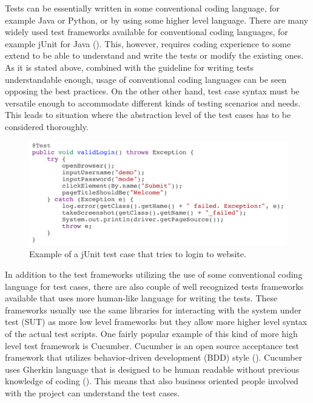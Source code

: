 Tests can be essentially written in some conventional coding language, for example Java or Python, or by using some higher level language. There are many widely used test frameworks available for conventional coding languages, for example jUnit for Java (\emph{\cite{junit}}). This, however, requires coding experience to some extend to be able to understand and write the tests or modify the existing ones. As it is stated above, combined with the guideline for writing tests understandable enough, usage of conventional coding languages can be seen opposing the best practices. On the other other hand, test case syntax must be versatile enough to accommodate different kinds of testing scenarios and needs. This leads to situation where the abstraction level of the test cases has to be considered thoroughly.

\begin{figure}[ht]
  \begin{center}
    \includegraphics[width=13cm]{images/junit_example.png}
    \caption{Example of a jUnit test case that tries to login to website.}
    \label{fig:junit}
  \end{center}
\end{figure}
\FloatBarrier

In addition to the test frameworks utilizing the use of some conventional coding language for test cases, there are also couple of well recognized tests frameworks available that uses more human-like language for writing the tests. These frameworks usually use the same libraries for interacting with the system under test (SUT) as more low level frameworks but they allow more higher level syntax of the actual test scripts. One fairly popular example of this kind of more high level test framework is Cucumber. Cucumber is an open source acceptance test framework that utilizes behavior-driven development (BDD) style (\emph{\cite{cucumber}}). Cucumber uses Gherkin language that is designed to be human readable without previous knowledge of coding (\emph{\cite{gherkin}}). This means that also business oriented people involved with the project can understand the test cases.

